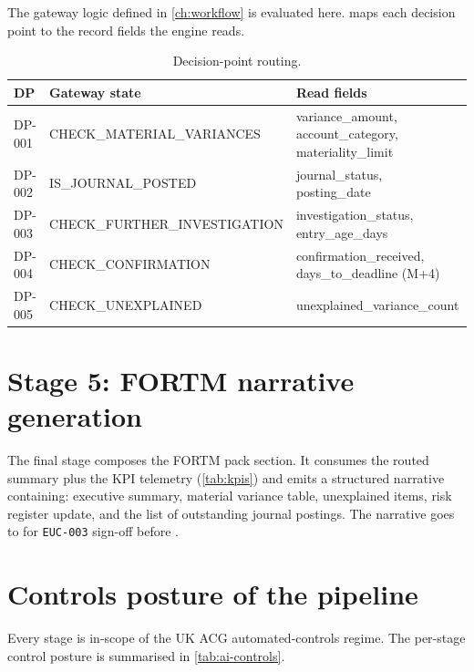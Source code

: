 The gateway logic defined in \cref{ch:workflow} is evaluated here.
 maps each decision point to the record fields the
engine reads.

\begin{table}[htbp]
\caption{Decision-point routing.}\label{tab:routing}
\centering
\small
\begin{tabularx}{\linewidth}{@{}llX@{}}
\toprule
\textbf{DP} & \textbf{Gateway state} & \textbf{Read fields} \\ \midrule
DP-001 & CHECK\_MATERIAL\_VARIANCES & variance\_amount, account\_category, materiality\_limit \\
DP-002 & IS\_JOURNAL\_POSTED         & journal\_status, posting\_date \\
DP-003 & CHECK\_FURTHER\_INVESTIGATION & investigation\_status, entry\_age\_days \\
DP-004 & CHECK\_CONFIRMATION         & confirmation\_received, days\_to\_deadline (M+4) \\
DP-005 & CHECK\_UNEXPLAINED          & unexplained\_variance\_count \\
\bottomrule
\end{tabularx}
\end{table}

\section{Stage 5: FORTM narrative generation}

The final stage composes the FORTM pack section. It consumes the
routed summary plus the KPI telemetry (\cref{tab:kpis}) and emits a
structured narrative containing: executive summary, material variance
table, unexplained items, risk register update, and the list of
outstanding journal postings. The narrative goes to
 for \texttt{EUC-003} sign-off before
.

\section{Controls posture of the pipeline}

Every stage is in-scope of the UK ACG automated-controls regime. The
per-stage control posture is summarised in \cref{tab:ai-controls}.

